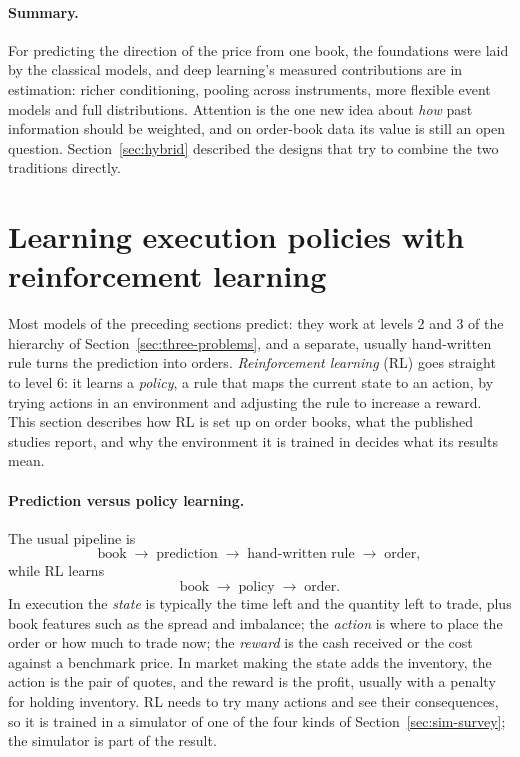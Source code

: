 \paragraph{Summary.} For predicting the direction of the price from one book, the foundations were laid by
the classical models, and deep learning's measured contributions are in estimation:
richer conditioning, pooling across instruments, more flexible event models and full distributions. Attention is the one new idea about \emph{how} past
information should be weighted, and on order-book data its value is still an open question. Section~\ref{sec:hybrid}
described the designs that try to combine the two traditions directly.

\section{Learning execution policies with reinforcement learning}
\label{sec:policy}

Most models of the preceding sections predict: they work at levels 2 and 3 of the hierarchy of Section~\ref{sec:three-problems}, and a
separate, usually hand-written rule turns the prediction into orders. \emph{Reinforcement learning} (RL) goes straight
to level 6: it learns a \emph{policy}, a rule that maps the current state to an action, by trying actions in an
environment and adjusting the rule to increase a reward. This section describes how RL is set up on order books, what
the published studies report, and why the environment it is trained in decides what its results mean.

\paragraph{Prediction versus policy learning.} The usual pipeline is
\[
  \text{book} \;\to\; \text{prediction} \;\to\; \text{hand-written rule} \;\to\; \text{order},
\]
while RL learns
\[
  \text{book} \;\to\; \text{policy} \;\to\; \text{order}.
\]
In execution the \emph{state} is typically the time left and the quantity left to trade, plus book features such as
the spread and imbalance; the \emph{action} is where to place the order or how much to trade now; the \emph{reward}
is the cash received or the cost against a benchmark price. In market making the state adds the inventory, the
action is the pair of quotes, and the reward is the profit, usually with a penalty for holding inventory. RL needs to
try many actions and see their consequences, so it is trained in a simulator of one of the four kinds of
Section~\ref{sec:sim-survey}; the simulator is part of the result.

